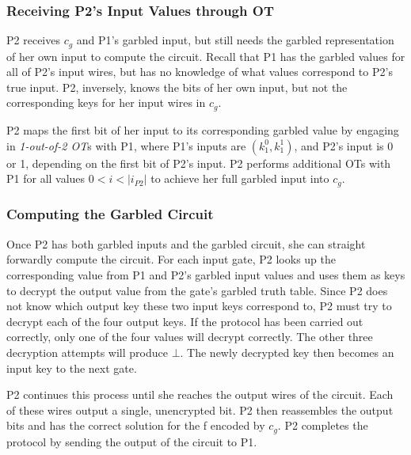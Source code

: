 \subsubsection{Receiving \ac{P2}'s Input Values through \ac{OT}}

\ac{P2} receives $c_g$ and \ac{P1}'s garbled input, but still needs the garbled representation of her own input to compute the circuit. Recall that \ac{P1} has the garbled values for all of \ac{P2}'s input wires, but has no knowledge of what values correspond to \ac{P2}'s true input. \ac{P2}, inversely, knows the bits of her own input, but not the corresponding keys for her input wires in $c_g$.

\ac{P2} maps the first bit of her input to its corresponding garbled value by engaging in \emph{1-out-of-2 \ac{OT}}s with \ac{P1}, where \ac{P1}'s inputs are $(k^0_1, k^1_1)$, and \ac{P2}'s input is 0 or 1, depending on the first bit of \ac{P2}'s input.  \ac{P2} performs additional \ac{OT}s with \ac{P1} for all values $0 < i < |i_{P2}|$ to achieve her full garbled input into $c_g$.

\subsubsection{Computing the Garbled Circuit}

Once \ac{P2} has both garbled inputs and the garbled circuit, she can straight forwardly compute the circuit.  For each input gate, \ac{P2} looks up the corresponding value from \ac{P1} and \ac{P2}'s garbled input values and uses them as keys to decrypt the output value from the gate's garbled truth table.  Since \ac{P2} does not know which output key these two input keys correspond to, \ac{P2} must try to decrypt each of the four output keys.  If the protocol has been carried out correctly, only one of the four values will decrypt correctly.  The other three decryption attempts will produce $\bot$. The newly decrypted key then becomes an input key to the next gate.

\ac{P2} continues this process until she reaches the output wires of the circuit.  Each of these wires output a single, unencrypted bit.  \ac{P2} then reassembles the output bits and has the correct solution for the \ac{f} encoded by $c_g$.  \ac{P2} completes the protocol by sending the output of the circuit to \ac{P1}.

